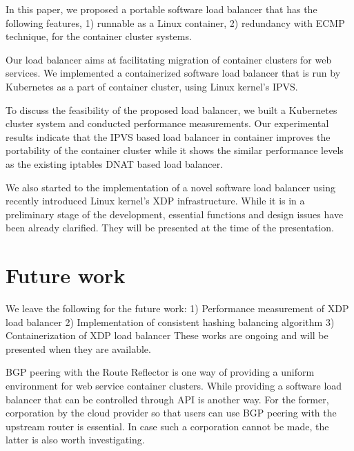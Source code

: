 In this paper, we proposed a portable software load balancer that has the following features, 1) runnable as a Linux container, 2) redundancy with ECMP technique,  for the container cluster systems.

Our load balancer aims at facilitating migration of container clusters for web services.
We implemented a containerized software load balancer that is run by Kubernetes as a part of container cluster,
using Linux kernel's IPVS.

To discuss the feasibility of the proposed load balancer, we built
a Kubernetes cluster system and conducted performance measurements.
Our experimental results indicate that the IPVS based load balancer in container improves the portability of
the container cluster while it shows the similar performance levels as the existing iptables DNAT based load balancer.

We also started to the implementation of a novel software load balancer using recently introduced Linux kernel's XDP infrastructure.
While it is in a preliminary stage of the development, essential functions and design issues have been already clarified.
They will be presented at the time of the presentation.

\section{Future work}\label{Future work}

We leave the following for the future work:
1) Performance measurement of XDP load balancer
2) Implementation of consistent hashing balancing algorithm
3) Containerization of XDP load balancer
These works are ongoing and will be presented when they are available.

BGP peering with the Route Reflector is one way of providing a uniform environment for web service container clusters.
While providing a software load balancer that can be controlled through API is another way.
For the former, corporation by the cloud provider so that users can use BGP peering with the upstream router is essential.
In case such a corporation cannot be made, the latter is also worth investigating.


